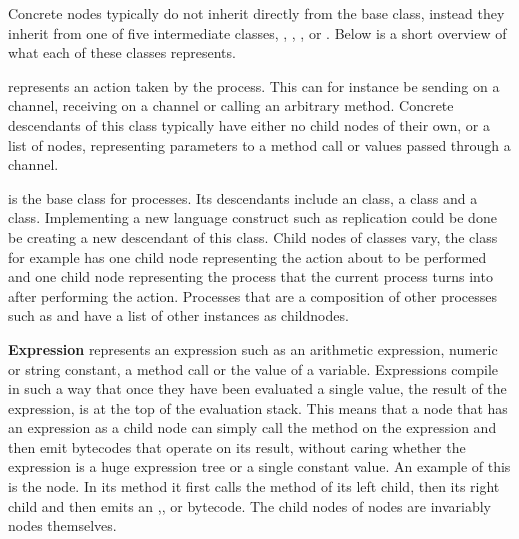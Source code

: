 	Concrete nodes typically do not inherit directly from the  base 
	class, instead they inherit from one of five intermediate classes, 
	, , , 
	 or . Below is a short 
	overview of what each of these classes represents.
	
	 represents an action taken by the 
	process. This can for instance be sending on a channel, receiving on a 
	channel or calling an arbitrary method. Concrete descendants of this class 
	typically have either no child nodes of their own, or a list of 
	 nodes, representing parameters to a method call or 
	values passed through a channel.

	 is the base class for processes. Its descendants include an 
	 class, a  class and a 
	 class. Implementing a new language construct 
	such as replication could be done be creating a new descendant of this 
	class. Child nodes of  classes vary, the 
	 class for example has one  child node 
	representing the action about to be performed and one  child 
	node representing the process that the current process turns into after 
	performing the action. Processes that are a composition of other processes 
	such as  and  
	have a list of other  instances as childnodes.
	
	\textbf{Expression} represents an expression such as an arithmetic 
	expression, numeric or string constant, a method call or the value of a 
	variable.	Expressions compile in such a way that once they have been 
	evaluated a single value, the result of the expression, is at the top of the 
	evaluation stack. This means that a node that has an expression as a child 
	node can simply call the  method on the expression and then 
	emit bytecodes that operate on its result, without caring whether the 
	expression is a huge expression tree or a single constant value. An example 
	of this is the  node. In its  
	method it first calls the  method of its left child, then 
	its right child and then emits an ,, or 
	 bytecode. The child nodes of  nodes are 
	invariably  nodes themselves.

